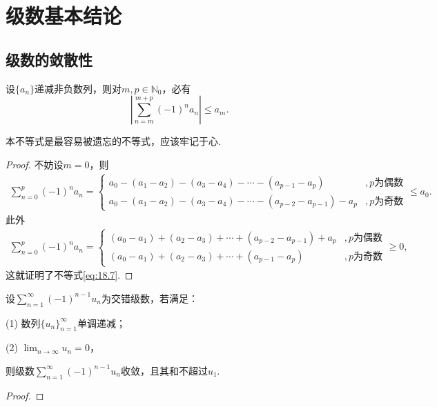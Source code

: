 \documentclass[../../main.tex]{subfiles}
\begin{document}
\section{级数基本结论}

\subsection{级数的敛散性}

\begin{theorem}[交错级数不等式]\label{theorem:交错级数不等式}
设\(\{a_n\}\)递减非负数列，则对\(m,p\in \mathbb{N}_0\)，必有
\begin{equation}\label{eq:18.7}
\left|\sum_{n = m}^{m + p} (-1)^n a_n\right| \leqslant a_m.
\end{equation}
\end{theorem}
\begin{note}
本不等式是最容易被遗忘的不等式，应该牢记于心.
\end{note}
\begin{proof}
不妨设\(m = 0\)，则
\begin{align*}
\sum_{n = 0}^{p} (-1)^n a_n = 
\begin{cases}
a_0 - (a_1 - a_2) - (a_3 - a_4) - \cdots - (a_{p - 1} - a_p) &, p\text{为偶数} \\
a_0 - (a_1 - a_2) - (a_3 - a_4) - \cdots - (a_{p - 2} - a_{p - 1}) - a_p &, p\text{为奇数}
\end{cases}
\leqslant a_0.
\end{align*}
此外
\begin{align*}
\sum_{n = 0}^{p} (-1)^n a_n = 
\begin{cases}
(a_0 - a_1) + (a_2 - a_3) + \cdots + (a_{p - 2} - a_{p - 1}) + a_p &, p\text{为偶数} \\
(a_0 - a_1) + (a_2 - a_3) + \cdots + (a_{p - 1} - a_p) &, p\text{为奇数}
\end{cases}
\geqslant 0,
\end{align*}
这就证明了不等式\eqref{eq:18.7}.

\end{proof}

\begin{theorem}\label{theorem:Leibniz(莱布尼兹)判别法}
设$\sum_{n=1}^{\infty} (-1)^{n - 1} u_n$为交错级数，若满足：

(1) 数列$\{u_n\}_{n=1}^{\infty}$单调递减；

(2) $\lim_{n \to \infty} u_n = 0$，

则级数$\sum_{n=1}^{\infty} (-1)^{n - 1} u_n$收敛，且其和不超过$u_1$.
\end{theorem}
\begin{proof}


\end{proof}
\end{document}
